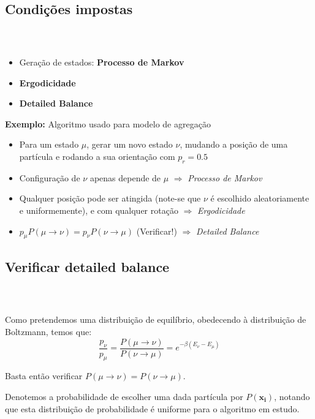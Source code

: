 \documentclass[11pt]{beamer}
\begin{document}
\subsection{Condições impostas}
\begin{frame}
\frametitle{\insertsection \\ {\small \insertsubsection}}
\begin{itemize}
\item Geração de estados: \textbf{Processo de Markov}
\item \textbf{Ergodicidade}
\item \textbf{Detailed Balance}
\end{itemize}
\pause
\textbf{Exemplo:} Algoritmo usado para modelo de agregação
\begin{itemize}
\item Para um estado $\mu$, gerar um novo estado $\nu$, mudando a posição de uma partícula e rodando a sua orientação com $p_r=0.5$
\item Configuração de $\nu$ apenas depende de $\mu$ $\Rightarrow$ \textit{Processo de Markov}
\item Qualquer posição pode ser atingida (note-se que $\nu$ é escolhido aleatoriamente e uniformemente), e com qualquer rotação $\Rightarrow$ \textit{Ergodicidade}
\item $p_{\mu}P(\mu\rightarrow\nu)=p_{\nu}P(\nu\rightarrow\mu)$ (Verificar!) $\Rightarrow$ \textit{Detailed Balance}
\end{itemize}

\end{frame}

\subsection{Verificar detailed balance}

\begin{frame}
\frametitle{\insertsection \\ {\small \insertsubsection}}
Como pretendemos uma distribuição de equilíbrio, obedecendo à distribuição de Boltzmann, temos que:
\begin{equation}
 \frac{p_{\nu}}{p_{\mu}}=\frac{P(\mu\rightarrow\nu)}{P(\nu\rightarrow\mu)}=e^{-\beta(E_{\nu}-E_{\mu})}
\end{equation}

Basta então verificar $P(\mu\rightarrow\nu)=P(\nu\rightarrow\mu)$.

\vspace{1cm}

Denotemos a probabilidade de escolher uma dada partícula por $P(\mathbf{x_i})$, notando que esta distribuição de probabilidade é uniforme para o algoritmo em estudo.

\end{frame}
\end{document}
